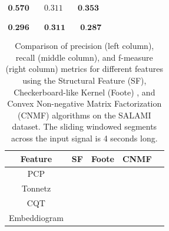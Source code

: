 \newsavebox\cqtFoote
\begin{lrbox}{\cqtFoote}
   $\begin{aligned}
     \textbf{0.570} & \quad 0.311 & \quad \textbf{0.353}
    \end{aligned} $
\end{lrbox}

\newsavebox\cqtCNMF
\begin{lrbox}{\cqtCNMF}
   $\begin{aligned}
     \textbf{0.296} & \quad \textbf{0.311} & \quad \textbf{0.287}
    \end{aligned} $
\end{lrbox}


\begin{table}[ht]
  \centering
  \begin{adjustbox}{width=\textwidth}
  \begin{threeparttable}
    \begin{tabular}{c|c|c|c|c} 
\toprule
     \textbf{Feature} & \textbf{SF} & \textbf{Foote} & \textbf{CNMF} 
     \\ \midrule 
     PCP & \usebox{\pcpSF} & \usebox{\pcpFoote} & \usebox{\pcpCNMF} \\\hline
     Tonnetz & \usebox{\tonnetzSF} & \usebox{\tonnetzFoote} & \usebox{\tonnetzCNMF} \\\hline
     CQT & \usebox{\cqtSF} & \usebox{\cqtFoote} & \usebox{\cqtCNMF} \\\hline
     Embeddiogram & \usebox{\embeddiobSF} & \usebox{\embeddiobFoote} & \usebox{\embeddiobCNMF} \\
     \bottomrule
    \end{tabular}
    \caption[Metric comparison: audio features and segmentation algorithms]{Comparison of precision (left column), recall (middle column), and f-measure (right column) metrics for different features using the Structural Feature (SF)\cite{sf}, Checkerboard-like Kernel (Foote) \cite{Foote2000AutomaticNovelty}, and Convex Non-negative Matrix Factorization (CNMF) \cite{NietoCONVEXIDENTIFICATION} algorithms on the SALAMI dataset. The sliding windowed segments across the input signal is 4 seconds long.}\label{ta:results}
  \end{threeparttable}
  \end{adjustbox}
\end{table}


